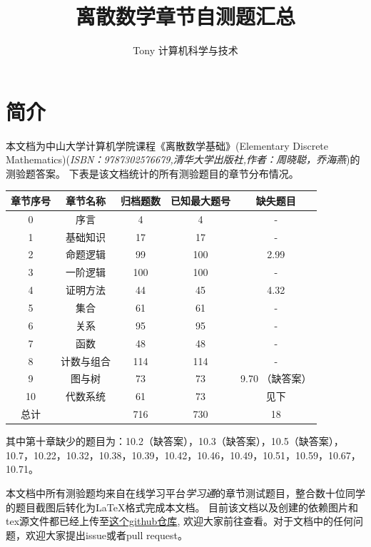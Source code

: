 \documentclass[UTF8, heading=true]{ctexart}
\title{\LARGE \textbf{离散数学章节自测题汇总}}
\author{Tony \hspace{2.89cm} 计算机科学与技术}
\begin{document}
\maketitle



{}
\section*{简介}

本文档为中山大学计算机学院课程《离散数学基础》(Elementary Discrete Mathematics)(\textit{ISBN：9787302576679,清华大学出版社,作者：周晓聪，乔海燕})的测验题答案。
下表是该文档统计的所有测验题目的章节分布情况。
\begin{table}[H]
  \renewcommand{\arraystretch}{1.5}
  \centering
\begin{tabular}{|c|c|c|c|c|}
  \hline 章节序号 & 章节名称 & 归档题数 & 已知最大题号 & 缺失题目 \\
  \hline 0 & 序言 & 4 & 4 & - \\
  \hline 1 & 基础知识 & 17 & 17 & - \\
  \hline 2 & 命题逻辑 & 99 & 100 & 2.99 \\
  \hline 3 & 一阶逻辑 & 100 & 100 & - \\
  \hline 4 & 证明方法 & 44 & 45 & 4.32 \\
  \hline 5 & 集合 & 61 & 61 & - \\
  \hline 6 & 关系 & 95 & 95 & - \\
  \hline 7 & 函数 & 48 & 48 & - \\
  \hline 8 & 计数与组合 & 114 & 114 & - \\
  \hline 9 & 图与树 & 73 & 73 & 9.70 （缺答案） \\
  \hline 10 & 代数系统 & 61 & 73 & 见下 \\
  \hline 总计& & 716 & 730 & 18 \\
  \hline
  \end{tabular}
\end{table}

其中第十章缺少的题目为：10.2（缺答案），10.3（缺答案），10.5（缺答案），10.7，10.22，10.32，10.38，10.39，10.42，10.46，10.49，10.51，10.59，10.67，10.71。

本文档中所有测验题均来自在线学习平台\textit{学习通}的章节测试题目，整合数十位同学的题目截图后转化为LaTeX格式完成本文档。
目前该文档以及创建的依赖图片和tex源文件都已经上传至\href{https://github.com/BlackMaple1203/SYSU-Discrete-Mathematics-Exam-Answers}{这个github仓库},
欢迎大家前往查看。对于文档中的任何问题，欢迎大家提出issue或者pull request。
\end{document}
